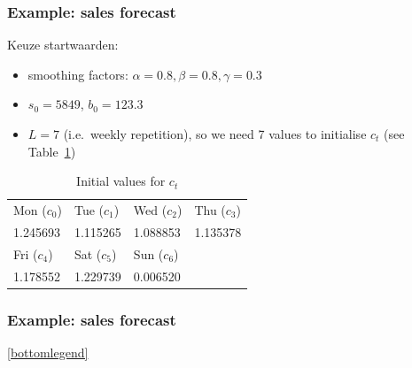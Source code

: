 \documentclass{beamer}
\begin{document}
\begin{frame}
  \frametitle{Example: sales forecast}

  Keuze startwaarden:

  \begin{itemize}
    \item smoothing factors: $\alpha = 0.8, \beta = 0.8, \gamma = 0.3$
    \item $s_0 = 5849$, $b_0 = 123.3$
    \item $L = 7$ (i.e.~weekly repetition), so we need 7 values to initialise $c_t$ (see Table~\ref{tab:winters-init-c})
  \end{itemize}

  \begin{table}
    \centering
    \begin{tabular}{l|l|l|l}
      Mon ($c_0$) & Tue ($c_1$) & Wed ($c_2$) & Thu ($c_3$)  \\
      1.245693 & 1.115265 & 1.088853 & 1.135378 \\
      \hline \hline
      Fri ($c_4$)  & Sat ($c_5$)  & Sun ($c_6$)  & \\
      1.178552 & 1.229739 & 0.006520 &
    \end{tabular}
    \caption{Initial values for $c_t$}
    \label{tab:winters-init-c}
  \end{table}
\end{frame}

\begin{frame}
  \frametitle{Example: sales forecast}


  \begin{center}

  \ref{bottomlegend}
\end{center}

\end{frame}
\end{document}

